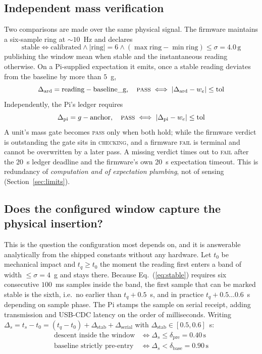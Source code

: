 \documentclass[conference]{IEEEtran}
\begin{document}
\subsection{Independent mass verification}
Two comparisons are made over the same physical signal. The firmware maintains a six-sample ring at
${\sim}10$~Hz and declares
\begin{equation}
\mathrm{stable} \iff \mathrm{calibrated} \wedge |\mathrm{ring}|{=}6 \wedge
  (\max\mathrm{ring}-\min\mathrm{ring}) \le \sigma = 4.0\,\mathrm{g}
\label{eq:stable}
\end{equation}
publishing the window mean when stable and the instantaneous reading otherwise. On a Pi-supplied
expectation it emits, once a stable reading deviates from the baseline by more than $5$~g,
\begin{equation}
\Delta_{\mathrm{ard}} = \mathrm{reading}-\mathrm{baseline\_g},\quad
  \textsc{pass} \iff |\Delta_{\mathrm{ard}}-w_e| \le \mathrm{tol}
\end{equation}
Independently, the Pi's ledger requires
\begin{equation}
\Delta_{\mathrm{pi}} = g-\mathrm{anchor},\quad
  \textsc{pass} \iff |\Delta_{\mathrm{pi}}-w_e| \le \mathrm{tol}
\end{equation}
A unit's mass gate becomes \textsc{pass} only when both hold; while the firmware verdict is
outstanding the gate sits in \textsc{checking}, and a firmware \textsc{fail} is terminal and cannot be
overwritten by a later pass. A missing verdict times out to \textsc{fail} after the 20~s ledger
deadline and the firmware's own 20~s expectation timeout. This is redundancy of \emph{computation and
of expectation plumbing}, not of sensing (Section~\ref{sec:limits}).

\subsection{Does the configured window capture the physical insertion?}
\label{sec:timing}
This is the question the configuration most depends on, and it is answerable analytically from the
shipped constants without any hardware. Let $t_0$ be mechanical impact and $t_q\ge t_0$ the moment
the reading first enters a band of width $\le\sigma=4$~g and stays there. Because
Eq.~(\ref{eq:stable}) requires six consecutive $100$~ms samples inside the band, the first sample that
can be marked stable is the sixth, i.e.\ no earlier than $t_q+0.5$~s, and in practice
$t_q+0.5\ldots0.6$~s depending on sample phase. The Pi stamps the sample on serial receipt, adding
transmission and USB-CDC latency on the order of milliseconds. Writing
$\Delta_s = t_s-t_0 = (t_q-t_0)+\Delta_{\mathrm{stab}}+\Delta_{\mathrm{serial}}$ with
$\Delta_{\mathrm{stab}}\in[0.5,0.6]$~s:
\begin{align}
\text{descent inside the window} &\iff \Delta_s \le \delta_{\mathrm{pre}} = 0.40\,\mathrm{s}
  \label{eq:c27}\\
\text{baseline strictly pre-entry} &\iff \Delta_s < \delta_{\mathrm{base}} = 0.90\,\mathrm{s}
  \label{eq:c28}
\end{align}
\end{document}
